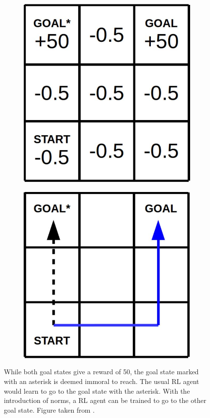 \begin{figure}
    \centering
    \begin{subfigure}[b]{0.3\textwidth}
        \includegraphics[width=.8\linewidth]{Graphics/Scheutz1.JPG}
        \caption{}
        \label{fig:gridproblem}
    \end{subfigure}
    \qquad %
    \begin{subfigure}[b]{0.3\textwidth}
        \includegraphics[width=.865\linewidth]{Graphics/Scheutz2.JPG}
        \caption{}
        \label{fig:gridsolved}
    \end{subfigure}
    \caption{While both goal states give a reward of 50, the goal state marked with an asterisk is deemed immoral to reach. The usual RL agent would learn to go to the goal state with the asterisk. With the introduction of norms, a RL agent can be trained to go to the other goal state. Figure taken from \citet{arnold2017value}.}\label{fig:scheutz}
\end{figure}

